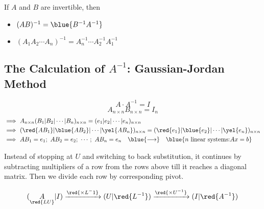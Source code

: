 \begin{proposition}
    If $A$ and $B$ are invertible, then 
    \begin{itemize}
        \item $(AB)^{-1} = \blue{B^{-1}A^{-1}}$
        \item \(
        (A_1A_2\cdots A_n)^{-1} = A_n^{-1}\cdots A_2^{-1}A_1^{-1}
        \)
    \end{itemize}
\end{proposition}

\subsection{The Calculation of $A^{-1}$: Gaussian-Jordan Method}

\[
    A\cdot A^{-1} = I
\]
\[
    A_{n\times n} B_{n\times n} = I_n
\]
\begin{align*}    
    &\Longrightarrow \ A_{n\times n}(B_1|B_2|\cdots|B_n)_{n\times n} = (e_1|e_2|\cdots|e_n)_{n\times n} \\
    &\Longrightarrow \ (\red{AB_1}|\blue{AB_2}|\cdots|\yel{AB_n})_{n\times n} = (\red{e_1}|\blue{e_2}|\cdots|\yel{e_n})_{n\times n} \\
    &\Longrightarrow \ AB_1 =e_1; \ AB_2 =e_2;\ \cdots ;\ AB_n = e_n \quad \blue{\longrightarrow} \quad \blue{n\text{ linear systems:} Ax=b}
\end{align*}

\begin{definition}
    Instead of stopping at $U$ and switching to back substitution, it continues by subtracting multipliers of a row from the rows above till it reaches a diagonal matrix. Then we divide each row by corresponding pivot.

    \[
    (\underset{\red{LU}}{A}|I) \xrightarrow{\red{\times L^-1}} (U|\red{L^{-1}}) \xrightarrow{\red{\times U^{-1}}} (I|\red{A^{-1}})
    \]
\end{definition}

